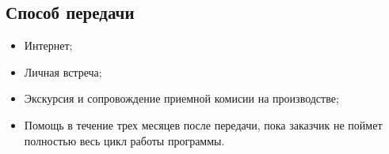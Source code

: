 \documentclass[a4paper,10pt]{article}
\begin{document}
\subsection{Способ передачи}

    \begin{itemize}
        \item Интернет;
        \item Личная встреча;
        \item Экскурсия и сопровождение приемной комисии на производстве;
        \item Помощь в течение трех месяцев после передачи, пока заказчик не поймет полностью весь цикл работы программы.
    \end{itemize}
\end{document}
